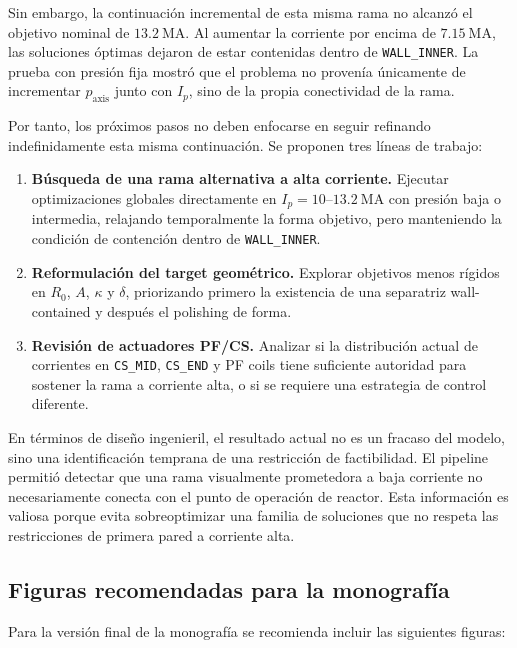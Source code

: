 \documentclass[11pt,a4paper]{article}
\begin{document}
Sin embargo, la continuación incremental de esta misma rama no alcanzó el objetivo nominal de
$13.2~\mathrm{MA}$. Al aumentar la corriente por encima de $7.15~\mathrm{MA}$, las soluciones
óptimas dejaron de estar contenidas dentro de \texttt{WALL\_INNER}. La prueba con presión fija
mostró que el problema no provenía únicamente de incrementar $p_{\mathrm{axis}}$ junto con
$I_p$, sino de la propia conectividad de la rama.

Por tanto, los próximos pasos no deben enfocarse en seguir refinando indefinidamente esta misma
continuación. Se proponen tres líneas de trabajo:

\begin{enumerate}
    \item \textbf{Búsqueda de una rama alternativa a alta corriente.} Ejecutar optimizaciones
    globales directamente en $I_p=10$--$13.2~\mathrm{MA}$ con presión baja o intermedia,
    relajando temporalmente la forma objetivo, pero manteniendo la condición de contención
    dentro de \texttt{WALL\_INNER}.

    \item \textbf{Reformulación del target geométrico.} Explorar objetivos menos rígidos en
    $R_0$, $A$, $\kappa$ y $\delta$, priorizando primero la existencia de una separatriz
    wall-contained y después el polishing de forma.

    \item \textbf{Revisión de actuadores PF/CS.} Analizar si la distribución actual de corrientes
    en \texttt{CS\_MID}, \texttt{CS\_END} y PF coils tiene suficiente autoridad para sostener
    la rama a corriente alta, o si se requiere una estrategia de control diferente.
\end{enumerate}

En términos de diseño ingenieril, el resultado actual no es un fracaso del modelo, sino una
identificación temprana de una restricción de factibilidad. El pipeline permitió detectar que
una rama visualmente prometedora a baja corriente no necesariamente conecta con el punto de
operación de reactor. Esta información es valiosa porque evita sobreoptimizar una familia de
soluciones que no respeta las restricciones de primera pared a corriente alta.

\subsection{Figuras recomendadas para la monografía}
Para la versión final de la monografía se recomienda incluir las siguientes figuras:
\end{document}

